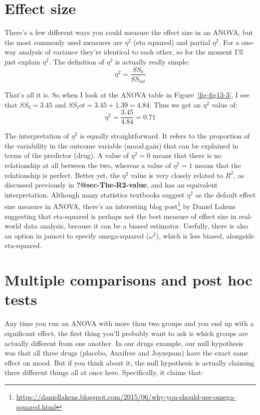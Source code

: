 \documentclass[
  a4paper,
]{book}
\begin{document}
\hypertarget{effect-size}{%
\section{Effect size}\label{effect-size}}

There's a few different ways you could measure the effect size in an
ANOVA, but the most commonly used measures are \(\eta^2\) (eta squared)
and partial \(\eta^2\). For a one-way analysis of variance they're
identical to each other, so for the moment I'll just explain \(\eta^2\).
The definition of \(\eta^2\) is actually really simple:
\[\eta^2=\frac{SS_b}{SS_{tot}}\]

That's all it is. So when I look at the ANOVA table in
Figure~\ref{fig-fig13-3}, I see that \(SS_b = 3.45\) and
\(SS_tot = 3.45 + 1.39 = 4.84\). Thus we get an \(\eta^2\) value of:
\[\eta^2=\frac{3.45}{4.84}=0.71\]

The interpretation of \(\eta^2\) is equally straightforward. It refers
to the proportion of the variability in the outcome variable (mood.gain)
that can be explained in terms of the predictor (drug). A value of
\(\eta^2=0\) means that there is no relationship at all between the two,
whereas a value of \(\eta^2=1\) means that the relationship is perfect.
Better yet, the \(\eta^2\) value is very closely related to \(R^2\), as
discussed previously in \textbf{?@sec-The-R2-value}, and has an
equivalent interpretation. Although many statistics textbooks suggest
\(\eta^2\) as the default effect size measure in ANOVA, there's an
interesting blog post\footnote{\url{https://daniellakens.blogspot.com/2015/06/why-you-should-use-omega-squared.html}}
by Daniel Lakens suggesting that eta-squared is perhaps not the best
measure of effect size in real-world data analysis, because it can be a
biased estimator. Usefully, there is also an option in jamovi to specify
omega-squared (\(\omega^2\)), which is less biased, alongside
eta-squared.

\hypertarget{multiple-comparisons-and-post-hoc-tests}{%
\section{Multiple comparisons and post hoc
tests}\label{multiple-comparisons-and-post-hoc-tests}}

Any time you run an ANOVA with more than two groups and you end up with
a significant effect, the first thing you'll probably want to ask is
which groups are actually different from one another. In our drugs
example, our null hypothesis was that all three drugs (placebo, Anxifree
and Joyzepam) have the exact same effect on mood. But if you think about
it, the null hypothesis is actually claiming three different things all
at once here. Specifically, it claims that:
\end{document}
